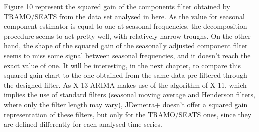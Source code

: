 \documentclass{article}
\begin{document}
Figure 10 represent the squared gain of the components filter obtained by TRAMO/SEATS from the data set analysed in here. As the value for seasonal component estimator is equal to one at seasonal frequencies, the decomposition procedure seems to act pretty well, with relatively narrow troughs. On the other hand, the shape of the squared gain of the seasonally adjusted component filter seems to miss some signal between seasonal frequencies, and it doesn't reach the exact value of one. It will be interesting, in the next chapter, to compare this squared gain chart to the one obtained from the same data pre-filtered through the designed filter.
As X-13-ARIMA makes use of the algorithm of X-11, which implies the use of standard filters (seasonal moving average and Henderson filters, where only the filter length may vary), JDemetra+ doesn't offer a squared gain representation of these filters, but only for the TRAMO/SEATS ones, since they are defined differently for each analysed time series.
\end{document}
